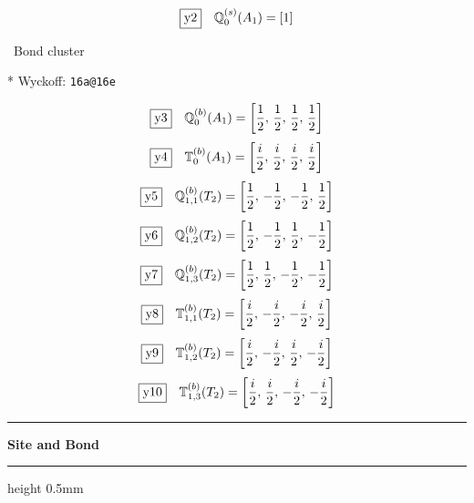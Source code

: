 \documentclass[fleqn,10pt,landscape]{jsarticle}
\begin{document}
\begin{dmath*}
\fbox{y2}\quad \mathbb{Q}_{0}^{(s)}(A_{1})=\left[ 1 \right]
\end{dmath*}
\vspace{5mm}

\noindent\textbullet\, Bond cluster

\vspace{5mm}

\noindent ** Wyckoff: \texttt{16a@16e}

\begin{dmath*}
\fbox{y3}\quad \mathbb{Q}_{0}^{(b)}(A_{1})=\left[ \frac{1}{2},\, \frac{1}{2},\, \frac{1}{2},\, \frac{1}{2} \right]
\end{dmath*}
\begin{dmath*}
\fbox{y4}\quad \mathbb{T}_{0}^{(b)}(A_{1})=\left[ \frac{i}{2},\, \frac{i}{2},\, \frac{i}{2},\, \frac{i}{2} \right]
\end{dmath*}
\begin{dmath*}
\fbox{y5}\quad \mathbb{Q}_{1,1}^{(b)}(T_{2})=\left[ \frac{1}{2},\, - \frac{1}{2},\, - \frac{1}{2},\, \frac{1}{2} \right]
\end{dmath*}
\begin{dmath*}
\fbox{y6}\quad \mathbb{Q}_{1,2}^{(b)}(T_{2})=\left[ \frac{1}{2},\, - \frac{1}{2},\, \frac{1}{2},\, - \frac{1}{2} \right]
\end{dmath*}
\begin{dmath*}
\fbox{y7}\quad \mathbb{Q}_{1,3}^{(b)}(T_{2})=\left[ \frac{1}{2},\, \frac{1}{2},\, - \frac{1}{2},\, - \frac{1}{2} \right]
\end{dmath*}
\begin{dmath*}
\fbox{y8}\quad \mathbb{T}_{1,1}^{(b)}(T_{2})=\left[ \frac{i}{2},\, - \frac{i}{2},\, - \frac{i}{2},\, \frac{i}{2} \right]
\end{dmath*}
\begin{dmath*}
\fbox{y9}\quad \mathbb{T}_{1,2}^{(b)}(T_{2})=\left[ \frac{i}{2},\, - \frac{i}{2},\, \frac{i}{2},\, - \frac{i}{2} \right]
\end{dmath*}
\begin{dmath*}
\fbox{y10}\quad \mathbb{T}_{1,3}^{(b)}(T_{2})=\left[ \frac{i}{2},\, \frac{i}{2},\, - \frac{i}{2},\, - \frac{i}{2} \right]
\end{dmath*}
\vspace{5mm}
\noindent \rule[0.5mm]{5mm}{0.5mm}\hspace{3mm}\textbf{Site and Bond}\hspace{3mm}\leaders\hrule height 0.5mm\hfill\kern0pt
\vspace{3mm}
\end{document}
